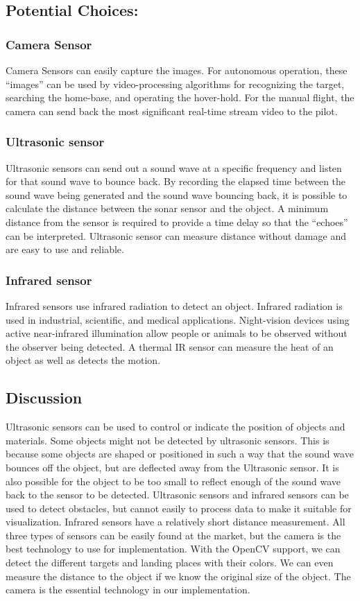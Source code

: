 \documentclass[letterpaper, 10, draftclsnofoot, onecolumn,compsoc]{IEEEtran}
\begin{document}
\subsection{Potential Choices:}
\subsubsection{Camera Sensor}
Camera Sensors can easily capture the images. For autonomous operation, these “images” can be used by video-processing algorithms for recognizing the target, searching the home-base, and operating the hover-hold. For the manual flight, the camera can send back the most significant real-time stream video to the pilot.

\subsubsection{Ultrasonic sensor}
Ultrasonic sensors can send out a sound wave at a specific frequency and listen for that sound wave to bounce back. By recording the elapsed time between the sound wave being generated and the sound wave bouncing back, it is possible to calculate the distance between the sonar sensor and the object. A minimum distance from the sensor is required to provide a time delay so that the “echoes” can be interpreted. Ultrasonic sensor can measure distance without damage and are easy to use and reliable. \cite{r1}

\subsubsection{Infrared sensor}
Infrared sensors use infrared radiation to detect an object. Infrared radiation is used in industrial, scientific, and medical applications. Night-vision devices using active near-infrared illumination allow people or animals to be observed without the observer being detected. \cite{r2} A thermal IR sensor can measure the heat of an object as well as detects the motion.

\subsection{Discussion}
Ultrasonic sensors can be used to control or indicate the position of objects and materials. Some objects might not be detected by ultrasonic sensors. This is because some objects are shaped or positioned in such a way that the sound wave bounces off the object, but are deflected away from the Ultrasonic sensor. It is also possible for the object to be too small to reflect enough of the sound wave back to the sensor to be detected. \cite{r5} Ultrasonic sensors and infrared sensors can be used to detect obstacles, but cannot easily to process data to make it suitable for visualization. Infrared sensors have a relatively short distance measurement. All three types of sensors can be easily found at the market, but the camera is the best technology to use for implementation. With the OpenCV support, we can detect the different targets and landing places with their colors. We can even measure the distance to the object if we know the original size of the object. The camera is the essential technology in our implementation.
\end{document}
